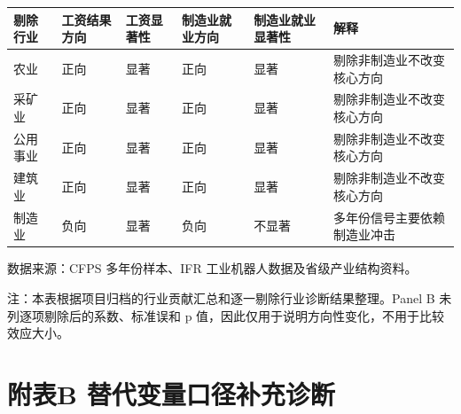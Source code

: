 \documentclass[UTF8, zihao=-4, a4paper, openany, fontset=none]{ctexrep}
\newcounter{none}
\numberwithin{equation}{chapter}
\begin{document}
{\def\LTcaptype{none} %
\begin{longtable}[]{@{}
  >{\raggedright\arraybackslash}p{}
  >{\raggedright\arraybackslash}p{}
  >{\raggedright\arraybackslash}p{}
  >{\raggedright\arraybackslash}p{}
  >{\raggedright\arraybackslash}p{}
  >{\raggedright\arraybackslash}p{}@{}}
\toprule\noalign{}
\begin{minipage}[b]{\linewidth}\raggedright
剔除行业
\end{minipage} & \begin{minipage}[b]{\linewidth}\raggedright
工资结果方向
\end{minipage} & \begin{minipage}[b]{\linewidth}\raggedright
工资显著性
\end{minipage} & \begin{minipage}[b]{\linewidth}\raggedright
制造业就业方向
\end{minipage} & \begin{minipage}[b]{\linewidth}\raggedright
制造业就业显著性
\end{minipage} & \begin{minipage}[b]{\linewidth}\raggedright
解释
\end{minipage} \\
\midrule\noalign{}
\endhead
\bottomrule\noalign{}
\endlastfoot
农业 & 正向 & 显著 & 正向 & 显著 & 剔除非制造业不改变核心方向 \\
采矿业 & 正向 & 显著 & 正向 & 显著 & 剔除非制造业不改变核心方向 \\
公用事业 & 正向 & 显著 & 正向 & 显著 & 剔除非制造业不改变核心方向 \\
建筑业 & 正向 & 显著 & 正向 & 显著 & 剔除非制造业不改变核心方向 \\
制造业 & 负向 & 显著 & 负向 & 不显著 & 多年份信号主要依赖制造业冲击 \\
\end{longtable}
}

数据来源：CFPS 多年份样本、IFR 工业机器人数据及省级产业结构资料。

注：本表根据项目归档的行业贡献汇总和逐一剔除行业诊断结果整理。Panel B 未列逐项剔除后的系数、标准误和 p 值，因此仅用于说明方向性变化，不用于比较效应大小。

\section{附表B 替代变量口径补充诊断}\label{ux9644ux8868b-ux66ffux4ee3ux53d8ux91cfux53e3ux5f84ux8865ux5145ux8bcaux65ad}
\end{document}
